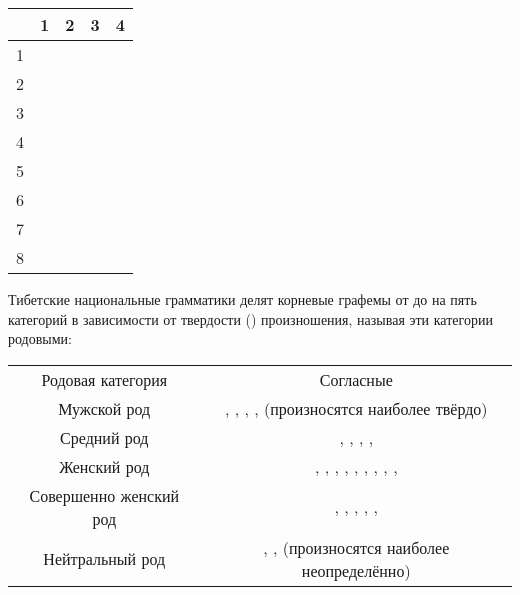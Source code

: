 \begin{tabularx}{\textwidth}{|C{1}|C{1}|C{1}|C{1}|C{1}|}
	\caption{Корневые графемы тибетского языка}\label{tab:1}
	\\
		\hline
	 & 1 & 2 & 3 & 4\\
	\endfirsthead
	 &  \toneR &  \toneR &  \toneV &  \toneV \\
	2 &  \toneR &  \toneR &  \toneV &  \toneV \\
	3 &  \toneR &  \toneR &  \toneV &  \toneV \\
	4 &  \toneR &  \toneR &  \toneV &  \toneV \\
	5 &  \toneR &  \toneR &  \toneV &  \toneV \\
	6 &  \toneV &  \toneV &  \toneV &  \toneV \\
	7 &  \toneV &  \toneV &  \toneR &  \toneR \\
	8 &  \toneR &  & & \\
	\hline
\end{tabularx}

Тибетские национальные грамматики делят корневые графемы от  до  на пять категорий в зависимости от твердости () произношения, называя эти категории родовыми:

\begin{tabularx}{\textwidth}{C{1}|C{1}}
	Родовая категория & Согласные\\
	Мужской род  & , , , ,  (произносятся наиболее твёрдо)\\
	Средний род  & , , , , \\
	Женский род  & , , , , , , , , , \\
	Совершенно женский род  & , , , , , \\
	Нейтральный род  & , ,  (произносятся наиболее неопределённо)
\end{tabularx}

